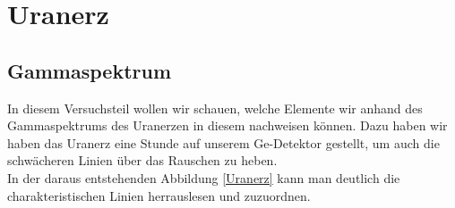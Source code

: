 \section{Uranerz}

\subsection{Gammaspektrum}

In diesem Versuchsteil wollen wir schauen, welche Elemente wir anhand des Gammaspektrums des Uranerzen in diesem nachweisen können. Dazu haben 
wir haben das Uranerz eine Stunde auf unserem Ge-Detektor gestellt, um auch die schwächeren Linien über das Rauschen zu heben.\\
In der daraus entstehenden Abbildung \ref{Uranerz} kann man deutlich die charakteristischen Linien herrauslesen und zuzuordnen\footnotemark.

